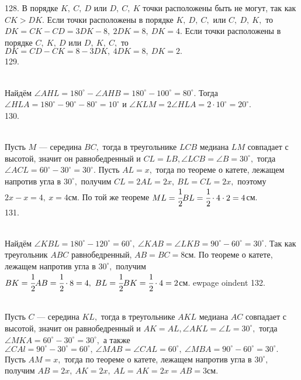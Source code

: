 128. В порядке $K,\ C,\ D$ или $D,\ C,\ K$ точки расположены быть не могут, так как $CK>DK.$ Если точки расположены в порядке $K,\ D,\ C,$ или $C,\ D,\ K,$ то $DK=CK-CD=3DK-8,\ 2DK=8,\ DK=4.$ Если точки расположены в порядке $C,\ K,\ D$ или $D,\ K,\ C,$ то $DK=CD-CK=8-3DK,\ 4DK=8,\ DK=2.$\\
129. \begin{figure}[ht!]
\end{figure}\\
Найдём $\angle AHL=180^\circ-\angle AHB=180^\circ-100^\circ=80^\circ.$ Тогда $\angle HLA=180^\circ-90^\circ-80^\circ=10^\circ$ и $\angle KLM=2\angle HLA=2\cdot10^\circ=20^\circ.$\\
130. \begin{figure}[ht!]
\end{figure}\\
Пусть $M$ --- середина $BC,$ тогда в треугольнике $LCB$ медиана $LM$ совпадает с высотой, значит он равнобедренный и  $CL=LB, \angle LCB=\angle B=30^\circ,$ тогда $\angle ACL=60^\circ-30^\circ=30^\circ.$ Пусть $AL=x,$ тогда по теореме о катете, лежащем напротив угла в $30^\circ,$ получим $CL=2AL=2x,\ BL=CL=2x,$ поэтому $2x-x=4,\ x=4$см. По той же теореме $ML=\cfrac{1}{2}BL=\cfrac{1}{2}\cdot4\cdot2=4$см.\\
131. \begin{figure}[ht!]
\end{figure}\\
Найдём $\angle KBL=180^\circ-120^\circ=60^\circ,\ \angle KAB=\angle LKB=90^\circ-60^\circ=30^\circ.$ Так как треугольник $ABC$ равнобедренный, $AB=BC=8$см. По теореме о катете, лежащем напротив угла в $30^\circ,$ получим $BK=\cfrac{1}{2}AB=\cfrac{1}{2}\cdot8=4,\ BL=\cfrac{1}{2}BK=\cfrac{1}{2}\cdot4=2$см.
ewpage
oindent
132. \begin{figure}[ht!]
\end{figure}\\
Пусть $C$ --- середина $KL,$ тогда в треугольнике $AKL$ медиана $AC$ совпадает с высотой, значит он равнобедренный и  $AK=AL, \angle AKL=\angle L=30^\circ,$ тогда $\angle MKA=60^\circ-30^\circ=30^\circ,$ а также $\angle CAl=90^\circ-30^\circ=60^\circ,\ \angle MAB=\angle CAL=60^\circ,\ \angle MBA=90^\circ-60^\circ=30^\circ.$
Пусть $AM=x,$ тогда по теореме о катете, лежащем напротив угла в $30^\circ,$ получим $AB=2x,\ AK=2x,\ AL=AK=2x=AB=3$см.\\
